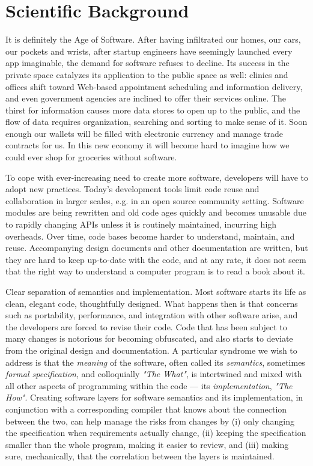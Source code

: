 \section{Scientific Background}

It is definitely the Age of Software.
After having infiltrated our homes, our cars, our pockets and wrists,
after startup engineers have seemingly launched every app imaginable,
the demand for software refuses to decline.
Its success in the private space catalyzes its application to the public
space as well: clinics and offices shift toward Web-based appointment
scheduling and information delivery, and even government agencies are
inclined to offer their services online.
The thirst for information causes more data stores to open up to the
public, and the flow of data requires organization, searching and sorting
to make sense of it.
Soon enough our wallets will be filled with electronic currency and
manage trade contracts for us.
In this new economy it will become hard to imagine how we could ever
shop for groceries without software.

To cope with ever-increasing need to create more software, developers
will have to adopt new practices.
Today's development tools limit code reuse and collaboration in larger
scales, e.g. in an open source community setting.
Software modules are being rewritten and old code ages quickly and becomes
unusable due to rapidly changing APIs unless it is routinely maintained,
incurring high overheads.
Over time, code bases become harder to understand, maintain, and reuse.
Accompanying design documents and other documentation are written, but
they are hard to keep up-to-date with the code, and at any rate, it does
not seem that the right way to understand a computer program is to read
a book about it.

\begin{paragraph}{Clear separation of semantics and implementation.}
Most software starts its life as clean, elegant code, thoughtfully designed.
What happens then is that concerns such as portability, performance,
and integration with other software arise, and the developers are forced
to revise their code.
Code that has been subject to many changes is notorious for becoming
obfuscated, and also starts to deviate from the original design and
documentation.
A particular syndrome we wish to address is that the \emph{meaning} of
the software, often called its \emph{semantics}, sometimes \emph{formal specification},
and colloquially \emph{"The What"}, is intertwined and mixed with all
other aspects of programming within the code --- its \emph{implementation},
\emph{"The How"}.
Creating software layers for software semantics and its implementation,
in conjunction with a corresponding compiler that knows about the connection
between the two, can help manage the risks from changes by (i) only changing the
specification when requirements actually change, (ii) keeping the specification
smaller than the whole program, making it easier to review, and (iii) making
sure, mechanically, that the correlation between the layers is maintained.
\end{paragraph}


